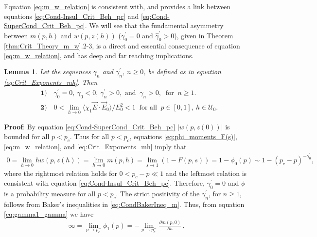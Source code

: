 \documentclass[english,12pt,jmp,graphicx]{revtex4-1}
\newtheorem{lemma}{Lemma}[section]
\newcommand{\gh}{\hat{\gamma}}
\begin{document}
Equation \eqref{eq:m_w_relation} is consistent with, and provides a
link between equations \eqref{eq:Cond-Insul_Crit_Beh_pc} and
\eqref{eq:Cond-SuperCond_Crit_Beh_pc}. We will see that the
fundamental asymmetry  between $m(p,h)$ and $w(p,z(h))$ ($\gamma_0^\prime=0$ and
$\gh_0^\prime>0$), given in Theorem \ref{thm:Crit_Theory_m_w}.2-3, is a
direct and essential consequence of equation \eqref{eq:m_w_relation},
and has deep and far reaching implications.      
%
\begin{lemma}\label{lem:zero_gamma0}
  Let the sequences $\gamma_n$ and $\gamma_n^\prime$, $n\geq0$, be defined as in
  equation \eqref{eq:Crit_Exponents_mh}. Then
  \begin{align*}
    &\mathbf{1)} \quad \gamma_0^\prime=0, \ \gamma_0<0, \ \gamma_n^\prime>0,   \text{ and } \ \gamma_n>0, \
        \text{ for } \ n\geq1. \\
    &\mathbf{2)} \quad 0<\lim_{h\to0}\langle\chi_1\vec{E}\cdot\vec{E}_0\rangle/E_0^2<1 \
         \text{ for all } \ p\in[0,1], \ h\in\mathcal{U}_0.
  \end{align*}
\end{lemma}
%
\noindent \textbf{Proof}:
%
By equation \eqref{eq:Cond-SuperCond_Crit_Beh_pc} $|w(p,z(0))|$ is  
bounded for all $p<p_c$. Thus for all $p<p_c$, equations
\eqref{eq:phi_moments_F(s)}, \eqref{eq:m_w_relation},
and \eqref{eq:Crit_Exponents_mh} imply that
%
\begin{align*}
  0=\lim_{h\to0}hw(p,z(h))=\lim_{h\to0}m(p,h)=\lim_{s\to1}(1-F(p,s))=1-\phi_0(p)\sim1-(p_c-p)^{-\gamma_0^\prime},
\end{align*}
%
where the rightmost relation holds for $0<p_c-p\ll1$ and the leftmost
relation is consistent with equation
\eqref{eq:Cond-Insul_Crit_Beh_pc}. Therefore, $\gamma_0^\prime=0$ and $\phi$ is a
probability measure for all $p<p_c$. The strict positivity of the
$\gamma_n^\prime$, for $n\geq1$, follows from Baker's inequalities
in \eqref{eq:CondBakerIneq_m}. Thus, from equation
\eqref{eq:gamma1_gamma} we have 
%
\begin{align}\label{eq:div_phi1}
  \infty=\lim_{p\to p_c^-}\phi_1(p)=-\lim_{p\to p_c^-}\frac{\partial m(p,0)}{\partial h}\,.
\end{align}
%
\end{document}
